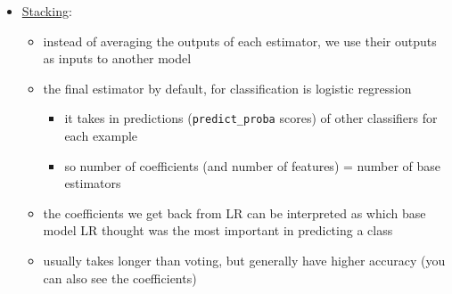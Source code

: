 \documentclass[10.5pt,a4paper, fleqn, dvipsnames]{article}
\begin{document}
\begin{itemize}
    \item \ul{Stacking}: 
    \begin{itemize}
        \item instead of averaging the outputs of each estimator, we use their outputs as inputs to another model 
        \item the final estimator by default, for classification is logistic regression
        \begin{itemize}[leftmargin = 2em]
            \item it takes in predictions (\lstinline{predict_proba} scores) of other classifiers for each example
            \item so number of coefficients (and number of features) = number of base estimators 
        \end{itemize}
        \item the coefficients we get back from LR can be interpreted as which base model LR thought was the most important in predicting a class 
        \item usually takes longer than voting, but generally have higher accuracy (you can also see the coefficients)
    \end{itemize}
\end{itemize}
\end{document}
